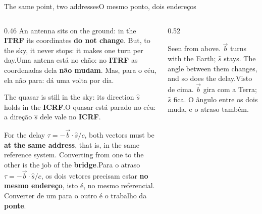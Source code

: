 \documentclass[aspectratio=169,11pt]{beamer}
\newcommand{\tr}[2]{\ifEN#2\else#1\fi}
\newcommand{\bnum}[1]{\textbf{\textcolor{mTeal}{#1}}}
\newcommand{\sist}[1]{\textcolor{corSist}{\textbf{#1}}}
\newcommand{\fram}[1]{\textcolor{corFrame}{\textbf{#1}}}
\newcommand{\gr}{\ensuremath{{}^{\circ}}}
\begin{document}
\begin{frame}{\tr{O mesmo ponto, dois endereços}{The same point, two addresses}}
  \begin{columns}[T]
    \begin{column}{0.46\textwidth}
      \small
      \tr{Uma antena está no chão: no \fram{ITRF} as coordenadas dela \bnum{não mudam}. Mas, para o céu, ela não para: dá uma volta por dia.}{An antenna sits on the ground: in the \fram{ITRF} its coordinates \bnum{do not change}. But, to the sky, it never stops: it makes one turn per day.}
      \medskip

      \tr{O quasar está parado no céu: a direção $\hat s$ dele vale no \sist{ICRF}.}{The quasar is still in the sky: its direction $\hat s$ holds in the \sist{ICRF}.}
      \medskip

      \tr{Para o atraso $\tau = -\vec b\cdot\hat s/c$, os dois vetores precisam estar \bnum{no mesmo endereço}, isto é, no mesmo referencial. Converter de um para o outro é o trabalho da \bnum{ponte}.}{For the delay $\tau = -\vec b\cdot\hat s/c$, both vectors must be \bnum{at the same address}, that is, in the same reference system. Converting from one to the other is the job of the \bnum{bridge}.}
    \end{column}
    \begin{column}{0.52\textwidth}
      \centering
      \par\smallskip
      {\scriptsize\textcolor{mStoneMid}{\tr{Visto de cima. $\vec b$ gira com a Terra; $\hat s$ fica. O ângulo entre os dois muda, e o atraso também.}{Seen from above. $\vec b$ turns with the Earth; $\hat s$ stays. The angle between them changes, and so does the delay.}}}
    \end{column}
  \end{columns}
\end{frame}
\end{document}
